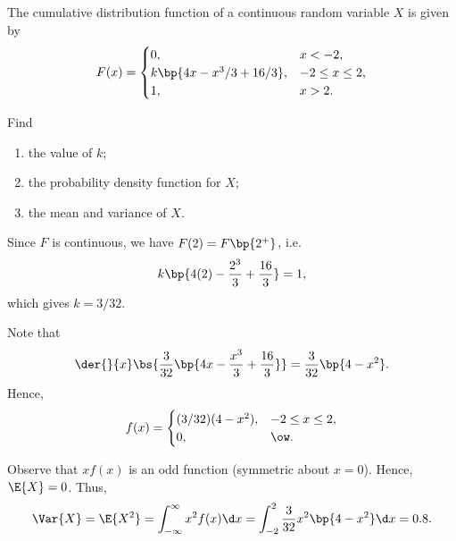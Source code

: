 \begin{problem}
    The cumulative distribution function of a continuous random variable $X$ is given by \[F(x) = \begin{cases}
        0, & x < -2,\\
        k\bp{4x - x^3/3 + 16/3}, & -2 \leq x \leq 2,\\
        1, & x > 2.
    \end{cases}\]

    Find
    \begin{enumerate}
        \item the value of $k$;
        \item the probability density function for $X$;
        \item the mean and variance of $X$.
    \end{enumerate}
\end{problem}
\begin{solution}
    \begin{ppart}
        Since $F$ is continuous, we have $F(2) = F\bp{2^+}$, i.e. \[k \bp{4(2) - \frac{2^3}3 + \frac{16}3} = 1,\] which gives $k = 3/32$.
    \end{ppart}
    \begin{ppart}
        Note that \[\der{}{x} \bs{\frac3{32}\bp{4x - \frac{x^3}3 + \frac{16}{3}}} = \frac{3}{32} \bp{4 - x^2}.\] Hence, \[f(x) = \begin{cases}
            (3/32) (4 - x^2), & -2 \leq x \leq 2,\\
            0, & \ow.
        \end{cases}\]
    \end{ppart}
    \begin{ppart}
        Observe that $x f(x)$ is an odd function (symmetric about $x = 0$). Hence, $\E{X} = 0$. Thus, \[\Var{X} = \E{X^2} = \int_{-\infty}^\infty x^2 f(x) \d x = \int_{-2}^2 \frac3{32} x^2 \bp{4 - x^2} \d x = 0.8.\]
    \end{ppart}
\end{solution}

